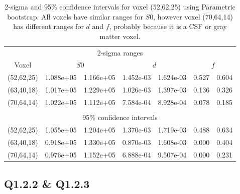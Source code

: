 \documentclass[11pt,a4paper,oneside]{report}
\begin{document}
\begin{table}[H]
\begin{center}
\begin{tabular}{c | c | c | c | c | c | c}
\multicolumn{7}{c}{2-sigma ranges}\\
 Voxel & \multicolumn{2}{c|}{$S0$} & \multicolumn{2}{c|}{$d$} & \multicolumn{2}{c}{$f$}\\ 
 \hline
 (52,62,25) & 1.088e+05 & 1.166e+05 & 1.452e-03 & 1.624e-03 & 0.527 & 0.604\\
 (63,40,18) & 1.017e+05 & 1.229e+05 & 1.026e-03 & 1.397e-03 & 0.136 & 0.326\\
 (70,64,14) & 1.022e+05 & 1.112e+05 & 7.584e-04 & 8.928e-04 & 0.078 & 0.185\\
  \hline
  \multicolumn{7}{c}{}\\
  \multicolumn{7}{c}{95\% confidence intervals}\\
 (52,62,25) & 1.055e+05 & 1.204e+05 & 1.370e-03 & 1.719e-03 & 0.488 & 0.634\\
 (63,40,18) & 0.918e+05 & 1.330e+05 & 0.870e-03 & 1.608e-03 & 0.000 & 0.404\\
 (70,64,14) & 0.976e+05 & 1.152e+05 & 6.888e-04 & 9.507e-04 & 0.000 & 0.231\\
\end{tabular}
\caption{2-sigma and 95\% confidence intervals for voxel (52,62,25) using Parametric bootstrap. All voxels have similar ranges for $S0$, however voxel (70,64,14) has different ranges for $d$ and $f$, probably because it is a CSF or gray matter voxel.}
\label{q121tab}
\end{center}
\end{table}


\subsection*{Q1.2.2 \& Q1.2.3}
\end{document}
